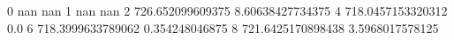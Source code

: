0 nan nan
1 nan nan
2 726.652099609375 8.60638427734375
4 718.0457153320312 0.0
6 718.3999633789062 0.354248046875
8 721.6425170898438 3.5968017578125
